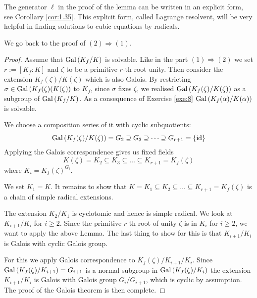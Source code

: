 \documentclass[twoside = false,	%
		headsepline,		%
		parskip = true,
		]{scrbook}						%
\begin{document}
    
   {\color{blue}The generator $\ell$ in the proof of the lemma can be written in an explicit form, see Corollary \ref{cor:1.35}. This explicit form, called Lagrange resolvent, will be very helpful in finding solutions to cubic equations by radicals.}
    
    
    We go back to the proof of $(2) \Rightarrow (1)$.
    
    \begin{proof}
    
    Assume that $\mathrm{Gal}\left( K_f/K\right)$ is solvable. Like in the part $(1) \Rightarrow (2)$ we set $r:=[K_f:K]$ and $\zeta$ to be a primitive $r$-th root unity. Then consider the extension $K_f(\zeta)/K(\zeta)$ which is also Galois. By restricting $\sigma \in \mathrm{Gal}\left( K_f(\zeta)(K(\zeta)\right)$ to $K_f$, since $\sigma$ fixes $\zeta$, we realised $\mathrm{Gal}\left( K_f(\zeta)/K(\zeta)\right)$ as a subgroup of $\mathrm{Gal}\left( K_f/K\right)$. As a consequence of Exercise \ref{exe:8} $\mathrm{Gal}\left( K_f(\alpha)/K(\alpha)\right)$ is solvable.
    
    We choose a composition series of it with cyclic subquotients:
    \begin{equation*}
        \mathrm{Gal}\left( K_f(\zeta)/K(\zeta)\right) = G_2 \supseteq G_3 \supseteq \dots \supseteq G_{r+1} = \{\mathrm{id}\}
    \end{equation*}
    Applying the Galois correspondence gives us fixed fields
    \begin{equation*}
        K(\zeta) = K_2 \subseteq K_3 \subseteq \dots \subseteq K_{r+1} = K_f(\zeta)
    \end{equation*}
    where $K_i = K_f(\zeta)^{G_i}$.
    
    We set $K_1 = K$. It remains to show that $K = K_1 \subseteq K_2 \subseteq \dots \subseteq K_{r+1} = K_f(\zeta)$ is a chain of simple radical extensions.
    
    The extension $K_2 / K_1$ is cyclotomic and hence is simple radical. We look at $K_{i+1}/K_i$ for $i \geq 2$.
    Since the primitive $r$-th root of unity $\zeta$ is in $K_i$ for $i \geq 2$, we want to apply the above Lemma.
    The last thing to show for this is that $K_{i+1}/K_i$ is Galois with cyclic Galois group.
    
    For this we apply Galois correspondence to $K_f(\zeta)/K_{i+1}/K_i$. 
    Since $\mathrm{Gal}\left( K_f(\zeta)/K_{i+1}\right) = G_{i+1}$ is a normal subgroup in $\mathrm{Gal}\left( K_f(\zeta)/K_i\right)$ the extension $K_{i+1}/K_i$ is Galois with Galois group $G_i/G_{i+1}$, which is cyclic by assumption.
    The proof of the Galois theorem is then complete.    
    \end{proof}
    
\end{document}
